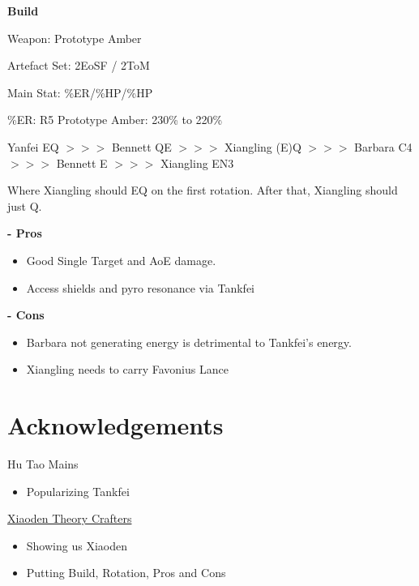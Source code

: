 \documentclass[11pt]{article}
\begin{document}
\textbf{\small{Build}}

Weapon: Prototype Amber 

Artefact Set: 2EoSF / 2ToM 

Main Stat: \%ER/\%HP/\%HP 

\%ER: R5 Prototype Amber: 230\% to 220\%

\begin{center}
    Yanfei EQ $>>>$ Bennett QE $>>>$ Xiangling (E)Q $>>>$ Barbara C4 $>>>$ Bennett E $>>>$ Xiangling EN3
\end{center} 
\begin{center} 
    Where Xiangling should EQ on the first rotation. After that, Xiangling should just Q. 
\end{center}

\textbf{\small{- Pros}}

\begin{itemize}
    \item Good Single Target and AoE damage. 
    \item Access shields and pyro resonance via Tankfei
\end{itemize}

\textbf{\small{- Cons}}

\begin{itemize}
    \item Barbara not generating energy is detrimental to Tankfei's energy.
    \item Xiangling needs to carry Favonius Lance
\end{itemize}

\newpage

\section{Acknowledgements}

Hu Tao Mains 

\begin{itemize}
    \item Popularizing Tankfei
\end{itemize}

\href{https://docs.google.com/document/d/15Fagrd1OD6fvgj0PEZKkbwiRmivgMd_MZZN_rcb8ZBE/edit#}{Xiaoden Theory Crafters}
\begin{itemize}
    \item Showing us Xiaoden
    \item Putting Build, Rotation, Pros and Cons
\end{itemize}
\end{document}
